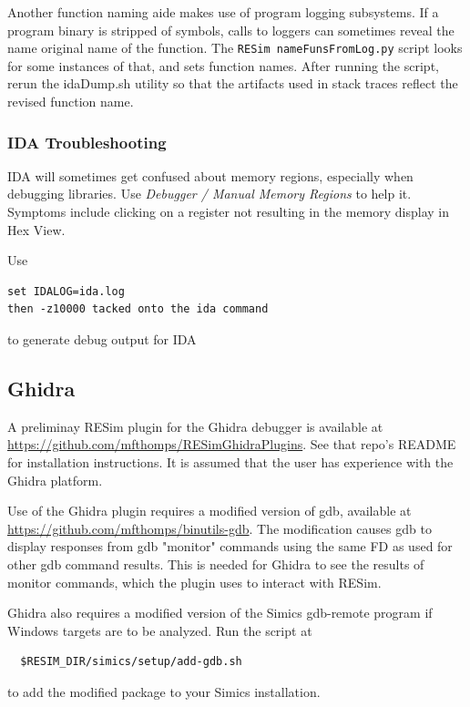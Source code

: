 \documentclass[titlepage]{article}
\begin{document}
Another function naming aide makes use of program logging subsystems.  If a program binary is stripped of symbols, calls to loggers can sometimes
reveal the name original name of the function.  The {\tt RESim nameFunsFromLog.py} script looks for some instances of that, and sets function names.
After running the script, rerun the idaDump.sh utility so that the artifacts used in stack traces reflect the revised function name.

\subsubsection{IDA Troubleshooting}
IDA will sometimes get confused about memory regions, especially when debugging libraries.  Use \textit{Debugger / Manual Memory Regions} to help it.
Symptoms include clicking on a register not resulting in the memory display in Hex View.

Use
\begin{verbatim}
set IDALOG=ida.log
then -z10000 tacked onto the ida command
\end{verbatim}
\noindent to generate debug output for IDA

\subsection{Ghidra}
\label{ghidra}
A preliminay RESim plugin for the Ghidra debugger is available at \url{https://github.com/mfthomps/RESimGhidraPlugins}.
See that repo's README for installation instructions.  It is assumed that the user has experience with the Ghidra platform.

Use of the Ghidra plugin requires a modified version of gdb, available at
\url{https://github.com/mfthomps/binutils-gdb}.  The modification causes
gdb to display responses from gdb "monitor" commands using the same FD as used
for other gdb command results.  This is needed for Ghidra to see the results of monitor commands, which the plugin
uses to interact with RESim.

Ghidra also requires a modified version of the Simics gdb-remote program if Windows targets are to be
analyzed.  Run the script at
\begin{verbatim}
  $RESIM_DIR/simics/setup/add-gdb.sh
\end{verbatim}
to add the modified package to your Simics installation.
\end{document}
